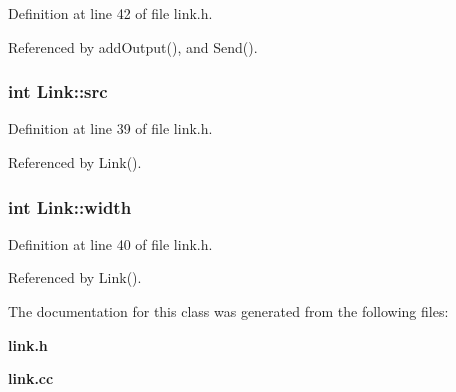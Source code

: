 Definition at line 42 of file link.h.

Referenced by addOutput(), and Send().
\subsubsection[{src}]{\setlength{\rightskip}{0pt plus 5cm}int {\bf Link::src}}\label{classLink_87fb6a54e52fc0c8cea06eafefc8b555}




Definition at line 39 of file link.h.

Referenced by Link().
\subsubsection[{width}]{\setlength{\rightskip}{0pt plus 5cm}int {\bf Link::width}}\label{classLink_6b5ee52bc53fe5063a5805a8f1a5694f}




Definition at line 40 of file link.h.

Referenced by Link().

The documentation for this class was generated from the following files:\begin{CompactItemize}
\item 
{\bf link.h}\item 
{\bf link.cc}\end{CompactItemize}
